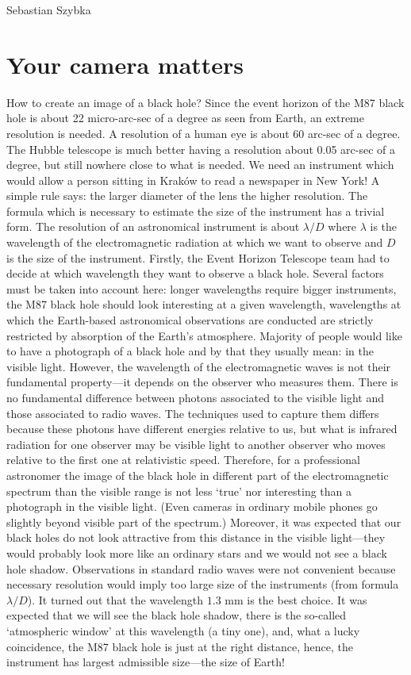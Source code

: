 \begin{artengenv}{Sebastian Szybka}
\section{Your camera matters}

How to create an image of a black hole? Since the event horizon of the M87 black hole is about 22 micro-arc-sec of a degree as seen from Earth, an extreme resolution is needed. A resolution of a human eye is about 60 arc-sec of a degree. The Hubble telescope is much better having a resolution about 0.05 arc-sec of a degree, but still nowhere close to what is needed. We need an instrument which would allow a person sitting in Kraków to read a newspaper in New York! A simple rule says: the larger diameter of the lens the higher resolution. The formula which is necessary to estimate the size of the instrument has a trivial form. The resolution of an astronomical instrument is about $\lambda/D$ where $\lambda$ is the wavelength of the electromagnetic radiation at which we want to observe and $D$ is the size of the instrument. Firstly, the Event Horizon Telescope team had to decide at which wavelength they want to observe a black hole. Several factors must be taken into account here: longer wavelengths require bigger instruments, the M87 black hole should look interesting at a given wavelength, wavelengths at which the Earth-based astronomical observations are conducted are strictly restricted by absorption of the Earth's atmosphere. Majority of people would like to have a photograph of a black hole and by that they usually mean: in the visible light. However, the wavelength of the electromagnetic waves is not their fundamental property---it depends on the observer who measures them. There is no fundamental difference between photons associated to the visible light and those associated to radio waves. The techniques used to capture them differs because these photons have different energies relative to us, but what is infrared radiation for one observer may be visible light to another observer who moves relative to the first one at relativistic speed. Therefore, for a professional astronomer the image of the black hole in different part of the electromagnetic spectrum than the visible range is not less `true' nor interesting than a photograph in the visible light. (Even cameras in ordinary mobile phones go slightly beyond visible part of the spectrum.) Moreover, it was expected that our black holes do not look attractive from this distance in the visible light---they would probably look more like an ordinary stars and we would not see a black hole shadow. Observations in standard radio waves were not convenient because necessary resolution would imply too large size of the instruments (from formula $\lambda/D$). It turned out that the wavelength $1.3$ mm is the best choice. It was expected that we will see the black hole shadow, there is the so-called `atmospheric window' at this wavelength (a tiny one), and, what a lucky coincidence, the M87 black hole is just at the right distance, hence, the instrument has largest admissible size---the size of Earth!


\end{artengenv}
